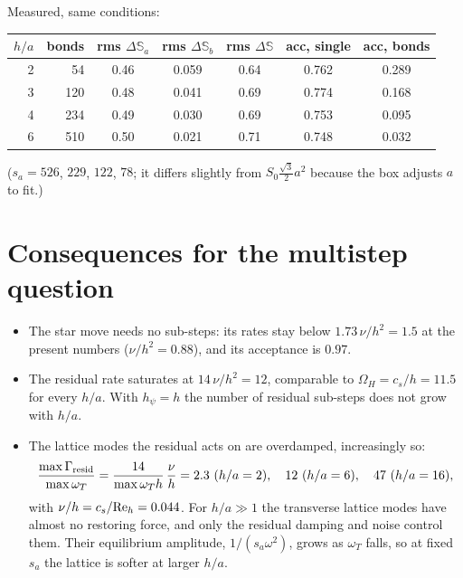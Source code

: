 \documentclass[11pt,aps,preprint,nofootinbib,superscriptaddress,tightenlines]{revtex4-2}
\def\st{\begin{equation}}
\def\stp{\end{equation}}
\begin{document}
Measured, same conditions:
\begin{center}
\begin{tabular}{rr|ccc|cc}
$h/a$ & bonds & rms $\Delta\mathbb S_a$ & rms $\Delta\mathbb S_b$ & rms $\Delta\mathbb S$ & acc, single & acc, bonds \\ \hline
2 &  54 & 0.46 & 0.059 & 0.64 & 0.762 & 0.289 \\
3 & 120 & 0.48 & 0.041 & 0.69 & 0.774 & 0.168 \\
4 & 234 & 0.49 & 0.030 & 0.69 & 0.753 & 0.095 \\
6 & 510 & 0.50 & 0.021 & 0.71 & 0.748 & 0.032
\end{tabular}
\end{center}
($s_a=526$, $229$, $122$, $78$; it differs slightly from $S_0\frac{\sqrt3}{2}a^2$ because the
box adjusts $a$ to fit.)

\section{Consequences for the multistep question}

\begin{itemize}
\item The star move needs no sub-steps: its rates stay below $1.73\,\nu/h^2=1.5$
  at the present numbers ($\nu/h^2=0.88$), and its acceptance is $0.97$.
\item The residual rate saturates at $14\,\nu/h^2=12$, comparable to
  $\Omega_H=c_s/h=11.5$ for every $h/a$.  With $h_\psi=h$ the number of residual
  sub-steps does not grow with $h/a$.
\item The lattice modes the residual acts on are overdamped, increasingly so:
  \st
  \frac{\max\Gamma_{\rm resid}}{\max\omega_T}=\frac{14}{\max\omega_Th}\,\frac{\nu}{h}
  =2.3\ (h/a=2),\quad 12\ (h/a=6),\quad 47\ (h/a=16),
  \stp
  with $\nu/h=c_s/{\rm Re}_h=0.044$.  For $h/a\gg1$ the transverse lattice modes
  have almost no restoring force, and only the residual damping and noise
  control them.  Their equilibrium amplitude, $1/(s_a\omega^2)$, grows as
  $\omega_T$ falls, so at fixed $s_a$ the lattice is softer at larger $h/a$.
\end{itemize}
\end{document}
